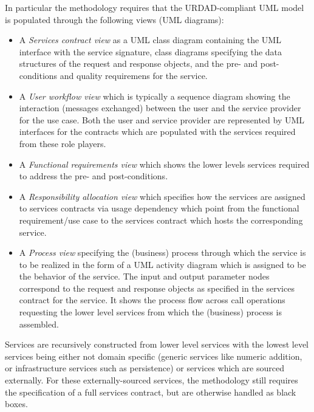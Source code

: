 In particular the methodology requires that the URDAD-compliant
UML model is populated through the following views (UML diagrams):
\begin{itemize}
  \item A {\em Services contract view} as a UML class diagram containing
        the UML interface with the service signature, class diagrams
		  specifying the data structures of the request and response objects,
		  and the pre- and post-conditions and quality requiremens for the service.
	\item A {\em User workflow view} which is typically a sequence diagram showing
			the interaction (messages exchanged) between the user and the service
			provider for the use case. Both the user and service provider are
			represented by UML interfaces for the contracts which are populated
			with the services required from these role players.
	\item A {\em Functional requirements view} which shows the lower levels
			services required to address the pre- and post-conditions.
	\item A {\em Responsibility allocation view} which specifies how the services are
assigned to services contracts  via usage dependency which point from the functional requirement/use case to the services contract which hosts the corresponding service.
	\item A {\em Process view} specifying the (business) process through which the
			service is to be realized in the form of a UML activity diagram which is
			assigned to be the behavior of the service. The input and output parameter nodes correspond to the request and response objects as specified in the services contract for the service. It shows the process flow across call operations requesting the lower level services from which the (business) process is assembled.
\end{itemize}

Services are recursively constructed from lower level services
with the lowest level services being either
not domain specific (generic services like numeric addition, or infrastructure services such as persistence) or
services which are sourced externally. For these externally-sourced services, the methodology still requires the specification of a full services contract, but are otherwise
handled as black boxes.
